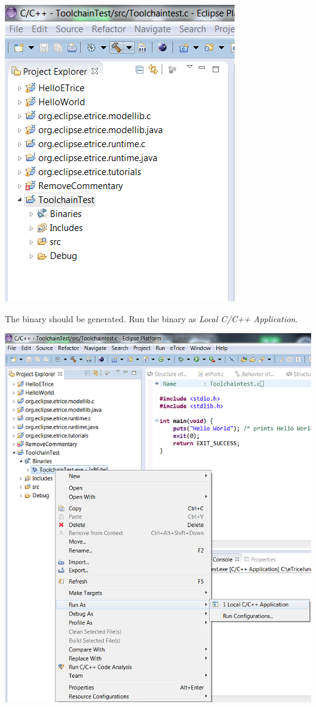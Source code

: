 \includegraphics{images/014-SetupWorkspaceC05.png}

The binary should be generated. Run the binary as \textit{Local C/C++ Application}.

\includegraphics{images/014-SetupWorkspaceC06.png}

